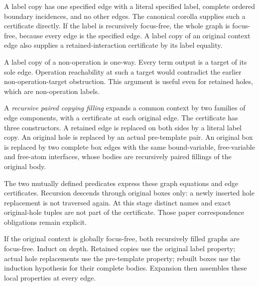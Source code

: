 

A label copy has one specified edge with a literal specified label,
complete ordered boundary incidences, and no other edges. The canonical
corolla supplies such a certificate directly. If the label is recursively
focus-free, the whole graph is focus-free, because every edge is the
specified edge. A label copy of an original context edge also supplies a
retained-interaction certificate by its label equality.





A label copy of a non-operation is one-way. Every term output is a
target of its sole edge. Operation reachability at such a target would
contradict the earlier non-operation-target obstruction. This argument is
useful even for retained holes, which are non-operation labels.


A \emph{recursive paired copying filling} expands a common context by two
families of edge components, with a certificate at each original edge.
The certificate has three constructors. A retained edge is replaced on both
sides by a literal label copy. An original hole is replaced by an actual
pre-template pair. An original box is replaced by two complete box edges
with the same bound-variable, free-variable and free-atom interfaces, whose
bodies are recursively paired fillings of the original body.

The two mutually defined predicates express these graph equations and edge
certificates. Recursion descends through original boxes only: a newly inserted
hole replacement is not traversed again. At this stage distinct names and
exact original-hole tuples are not part of the certificate. Those paper
correspondence obligations remain explicit.



If the original context is globally focus-free, both recursively filled
graphs are focus-free. Induct on depth. Retained copies use the original
label property; actual hole replacements use the pre-template property;
rebuilt boxes use the induction hypothesis for their complete bodies.
Expansion then assembles these local properties at every edge.

